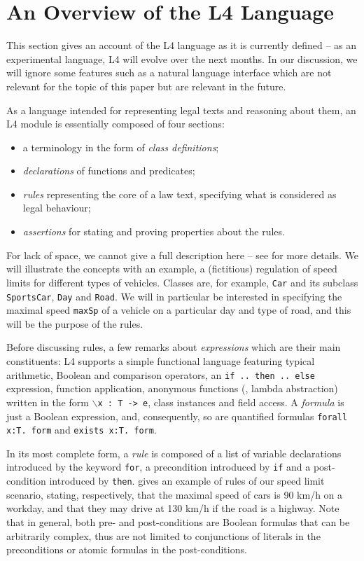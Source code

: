 \section{An Overview of the L4 Language}\label{sec:l4_language}

This section gives an account of the L4 language as it is currently defined --
as an experimental language, L4 will evolve over the next months. In our
discussion, we will ignore some features such as a natural language interface
\citep{listemnmaa2021cnl} which are not relevant for the topic of this paper
but are relevant in the future. 

As a language intended for representing legal texts and reasoning about them,
an L4 module is essentially composed of four sections:
\begin{itemize}
\item a terminology in the form of \emph{class definitions};
\item \emph{declarations} of functions and predicates;
\item \emph{rules} representing the core of a law text, specifying what is
  considered as legal behaviour;
\item \emph{assertions} for stating and proving properties about the rules.
\end{itemize}

For lack of space, we cannot give a full description here -- see
 for more details. 
We will illustrate the concepts with an example, a (fictitious) regulation of speed
limits for different types of vehicles. Classes are, for example, \texttt{Car}
and its subclass \texttt{SportsCar}, \texttt{Day} and \texttt{Road}. We will
in particular be interested in specifying the maximal speed \texttt{maxSp} of
a vehicle on a particular day and type of road, and this will be the purpose
of the rules.

Before discussing rules, a few remarks about \emph{expressions} which are
their main constituents: L4 supports a simple functional language featuring
typical arithmetic, Boolean and comparison operators, an \texttt{if .. then
  .. else} expression, function application, anonymous functions (\ie, lambda
abstraction) written in the form \texttt{$\backslash$x : T -> e}, class
instances and field access. A \emph{formula} is just a
Boolean expression, and, consequently, so are quantified formulas
\texttt{forall x:T. form} and \texttt{exists x:T. form}.

In its most complete form, a \emph{rule} is composed of a list of variable
declarations introduced by the keyword \texttt{for}, a precondition introduced
by \texttt{if} and a post-condition introduced by
\texttt{then}.  gives an example of rules of our speed limit
scenario, stating, respectively, that the maximal speed of cars is 90 km/h on a
workday,
and that they may drive at 130 km/h if the road is a highway.  Note that in
general, both pre- and post-conditions are Boolean formulas that can be
arbitrarily complex, thus are not limited to conjunctions of literals in the
preconditions or atomic formulas in the post-conditions.

